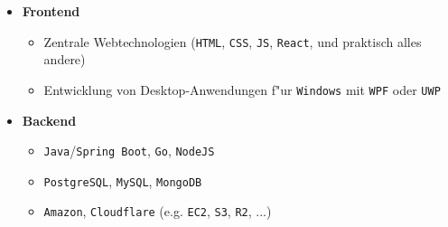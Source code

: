 \documentclass[]{article}
\begin{document}
\vspace{5pt}
\begin{minipage}[t]{0.49\linewidth}
    \begin{itemize}[leftmargin=0.15in, rightmargin=0.15in, label={}]
        \item {\large\bfseries Frontend}

            \begin{itemize}
                \item Zentrale Webtechnologien (\verb|HTML|, \verb|CSS|,
                    \verb|JS|, \verb|React|, und praktisch alles andere)
                \item Entwicklung von Desktop-Anwendungen f"ur \verb|Windows| mit \verb|WPF| oder \verb|UWP|
            \end{itemize}
    \end{itemize}
\end{minipage}
\hspace{10pt}
\begin{minipage}[t]{0.49\linewidth}
    \begin{itemize}[leftmargin=0.15in, rightmargin=0.15in, label={}]
        \item {\large\bfseries Backend}
            \begin{itemize}
                \item \verb|Java|/\verb|Spring Boot|, \verb|Go|, \verb|NodeJS|
                \item \verb|PostgreSQL|, \verb|MySQL|, \verb|MongoDB|
                \item \verb|Amazon|, \verb|Cloudflare| (e.g. \verb|EC2|, \verb|S3|, \verb|R2|, ...)
            \end{itemize}
    \end{itemize}
\end{minipage}
\\[20pt]
\end{document}
